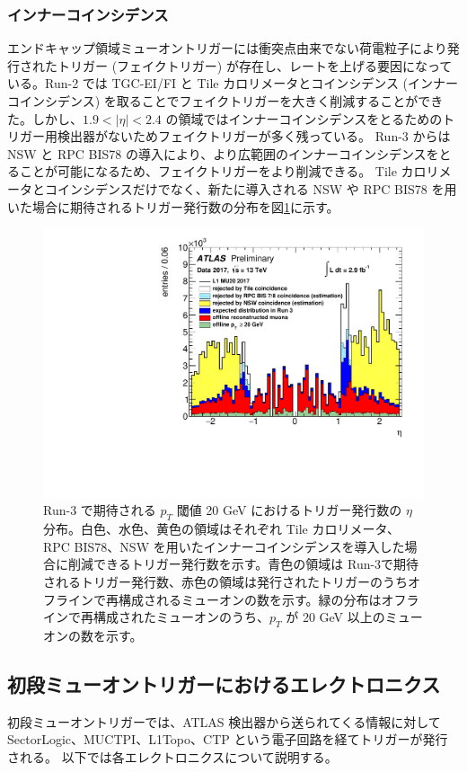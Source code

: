 \subsubsection{インナーコインシデンス}
エンドキャップ領域ミューオントリガーには衝突点由来でない荷電粒子により発行されたトリガー (フェイクトリガー) が存在し、レートを上げる要因になっている。Run-2 では TGC-EI/FI と Tile カロリメータとコインシデンス (インナーコインシデンス) を取ることでフェイクトリガーを大きく削減することができた。しかし、$1.9 < |\eta| < 2.4$ の領域ではインナーコインシデンスをとるためのトリガー用検出器がないためフェイクトリガーが多く残っている。
Run-3 からは NSW と RPC BIS78 の導入により、より広範囲のインナーコインシデンスをとることが可能になるため、フェイクトリガーをより削減できる。
Tile カロリメータとコインシデンスだけでなく、新たに導入される NSW や RPC BIS78 を用いた場合に期待されるトリガー発行数の分布を図\ref{fig:Rate_innercoincidence}に示す。

\begin{figure}[tb]
  \centering
    \includegraphics[clip, width=14cm]{fig/3/ATL-COM-DAQ-2018-033-fig2.pdf}
  \caption{Run-3 で期待される $p_T$ 閾値 20 GeV におけるトリガー発行数の $\eta$ 分布。白色、水色、黄色の領域はそれぞれ Tile カロリメータ、RPC BIS78、NSW を用いたインナーコインシデンスを導入した場合に削減できるトリガー発行数を示す。青色の領域は Run-3で期待されるトリガー発行数、赤色の領域は発行されたトリガーのうちオフラインで再構成されるミューオンの数を示す。緑の分布はオフラインで再構成されたミューオンのうち、$p_T$ が 20 GeV 以上のミューオンの数を示す。}
  \label{fig:Rate_innercoincidence}
\end{figure}

\subsection{初段ミューオントリガーにおけるエレクトロニクス}
初段ミューオントリガーでは、ATLAS 検出器から送られてくる情報に対して SectorLogic、MUCTPI、L1Topo、CTP という電子回路を経てトリガーが発行される。
以下では各エレクトロニクスについて説明する。

